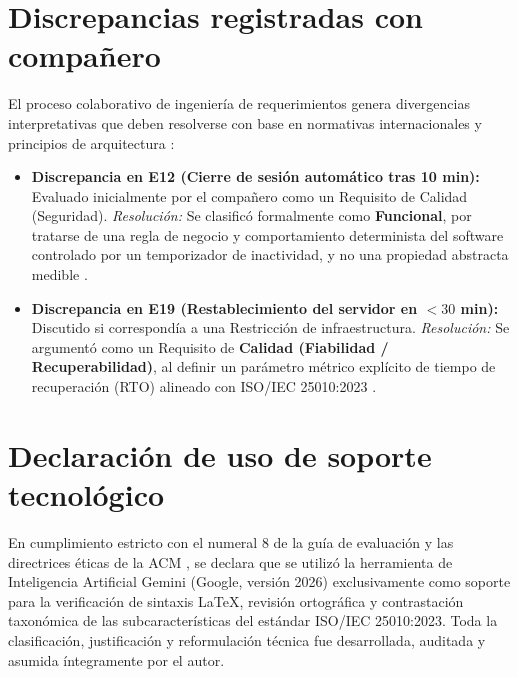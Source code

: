 \documentclass[11pt,a4paper]{article}
\begin{document}
	\section{Discrepancias registradas con compañero}
	El proceso colaborativo de ingeniería de requerimientos genera divergencias interpretativas que deben resolverse con base en normativas internacionales y principios de arquitectura \cite{pohl2025, wiegers2013, beck2000}:
	\begin{itemize}[leftmargin=*, itemsep=4pt]
		\item \textbf{Discrepancia en E12 (Cierre de sesión automático tras 10 min):} Evaluado inicialmente por el compañero como un Requisito de Calidad (Seguridad). \textit{Resolución:} Se clasificó formalmente como \textbf{Funcional}, por tratarse de una regla de negocio y comportamiento determinista del software controlado por un temporizador de inactividad, y no una propiedad abstracta medible \cite{sommerville2019, iso29148}.
		\item \textbf{Discrepancia en E19 (Restablecimiento del servidor en $< 30$ min):} Discutido si correspondía a una Restricción de infraestructura. \textit{Resolución:} Se argumentó como un Requisito de \textbf{Calidad (Fiabilidad / Recuperabilidad)}, al definir un parámetro métrico explícito de tiempo de recuperación (RTO) alineado con ISO/IEC 25010:2023 \cite{iso25010, bass2021}.
	\end{itemize}
	
	\section{Declaración de uso de soporte tecnológico}
	En cumplimiento estricto con el numeral 8 de la guía de evaluación y las directrices éticas de la ACM \cite{acm2018}, se declara que se utilizó la herramienta de Inteligencia Artificial Gemini (Google, versión 2026) exclusivamente como soporte para la verificación de sintaxis LaTeX, revisión ortográfica y contrastación taxonómica de las subcaracterísticas del estándar ISO/IEC 25010:2023. Toda la clasificación, justificación y reformulación técnica fue desarrollada, auditada y asumida íntegramente por el autor.
	
	
	
	
\end{document}

